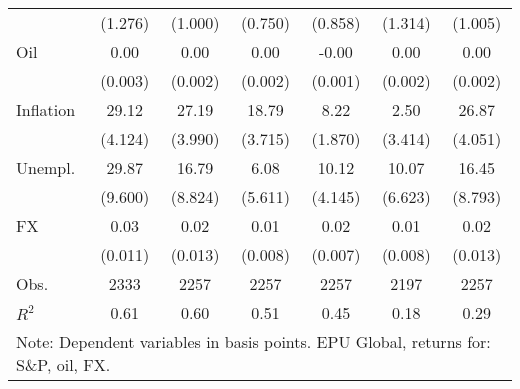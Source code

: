 \begin{table}[htbp]
\begin{tabular*}{0.8\hsize}{@{\hskip\tabcolsep\extracolsep\fill}l*{6}{c}}
                    &     (1.276)         &     (1.000)         &     (0.750)         &     (0.858)         &     (1.314)         &     (1.005)         \\
\addlinespace
Oil                 &        0.00         &        0.00         &        0.00         &       -0.00         &        0.00         &        0.00         \\
                    &     (0.003)         &     (0.002)         &     (0.002)         &     (0.001)         &     (0.002)         &     (0.002)         \\
\addlinespace
Inflation           &       29.12\sym{***}&       27.19\sym{***}&       18.79\sym{***}&        8.22\sym{***}&        2.50         &       26.87\sym{***}\\
                    &     (4.124)         &     (3.990)         &     (3.715)         &     (1.870)         &     (3.414)         &     (4.051)         \\
\addlinespace
Unempl.             &       29.87\sym{**} &       16.79         &        6.08         &       10.12\sym{*}  &       10.07         &       16.45         \\
                    &     (9.600)         &     (8.824)         &     (5.611)         &     (4.145)         &     (6.623)         &     (8.793)         \\
\addlinespace
FX                  &        0.03\sym{**} &        0.02         &        0.01         &        0.02\sym{*}  &        0.01         &        0.02         \\
                    &     (0.011)         &     (0.013)         &     (0.008)         &     (0.007)         &     (0.008)         &     (0.013)         \\
\midrule
Obs.        &        2333         &        2257         &        2257         &        2257         &        2197         &        2257         \\
\(R^{2}\)           &        0.61         &        0.60         &        0.51         &        0.45         &        0.18         &        0.29         \\
\bottomrule
\multicolumn{7}{l}{\footnotesize Note: Dependent variables in basis points. EPU Global, returns for: S\&P, oil, FX.}\\
\end{tabular*}
\end{table}
